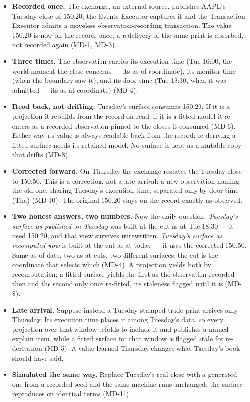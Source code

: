 \documentclass[11pt,a4paper]{article}
\begin{document}
\begin{itemize}
\item \textbf{Recorded once.} The exchange, an external source, publishes
  AAPL's Tuesday close of 150.20; the Events Executor captures it and the
  Transaction Executor admits a moveless observation-recording
  transaction. The value 150.20 is now on the record, once; a redelivery
  of the same print is absorbed, not recorded again (MD-1, MD-3).
\item \textbf{Three times.} The observation carries its execution time
  (Tue 16:00, the world-moment the close concerns --- its as-of
  coordinate), its monitor time (when the boundary saw it), and its door
  time (Tue 18:30, when it was admitted --- its as-at coordinate) (MD-4).
\item \textbf{Read back, not drifting.} Tuesday's surface consumes
  150.20. If it is a projection it rebuilds from the record on read; if
  it is a fitted model it re-enters as a recorded observation pinned to
  the closes it consumed (MD-6). Either way its value is always readable
  back from the record; re-deriving a fitted surface needs its retained
  model. No surface is kept as a mutable copy that drifts (MD-8).
\item \textbf{Corrected forward.} On Thursday the exchange restates the
  Tuesday close to 150.50. This is a correction, not a late arrival: a
  new observation naming the old one, sharing Tuesday's execution time,
  separated only by door time (Thu) (MD-10). The original 150.20 stays on
  the record exactly as observed.
\item \textbf{Two honest answers, two numbers.} Now the daily question.
  \emph{Tuesday's surface as published on Tuesday} was built at the cut
  as-at Tue 18:30 --- it used 150.20, and that view survives unrewritten.
  \emph{Tuesday's surface as recomputed now} is built at the cut as-at
  today --- it uses the corrected 150.50. Same as-of date, two as-at
  cuts, two different surfaces; the cut is the coordinate that selects
  which (MD-4). A projection yields both by recomputation; a fitted
  surface yields the first as the observation recorded then and the
  second only once re-fitted, its staleness flagged until it is (MD-8).
\item \textbf{Late arrival.} Suppose instead a Tuesday-stamped trade
  print arrives only Thursday. Its execution time places it among
  Tuesday's data, so every projection over that window refolds to include
  it and publishes a named explain item, while a fitted surface for that
  window is flagged stale for re-derivation (MD-5). A value learned
  Thursday changes what Tuesday's book should have said.
\item \textbf{Simulated the same way.} Replace Tuesday's real close with
  a generated one from a recorded seed and the same machine runs
  unchanged; the surface reproduces on identical terms (MD-11).
\end{itemize}
\end{document}
